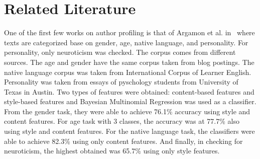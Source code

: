 \documentclass[a4paper]{llncs}
\begin{document}


 


\section{Related Literature}
One of the first few works on author profiling is that of Argamon et al. in~\cite{argamon2009automatically} where texts are categorized base on gender, age, native language, and personality. For personality, only neuroticism was checked. The corpus comes from different sources. The age and gender have the same corpus taken from blog postings. The native language corpus was taken from International Corpus of Learner English. Personality was taken from essays of pyschology students from University of Texas in Austin. Two types of features were obtained: content-based features and style-based features and Bayesian Multinomial Regression was used as a classifier. From the gender task, they were able to achieve 76.1\% accuracy using style and content features. For age task with 3 classes, the accuracy was at 77.7\% also using style and content features. For the native language task, the classifiers were able to achieve 82.3\% using only content features. And finally, in checking for neuroticism, the highest obtained was 65.7\% using only style features. 
\end{document}
